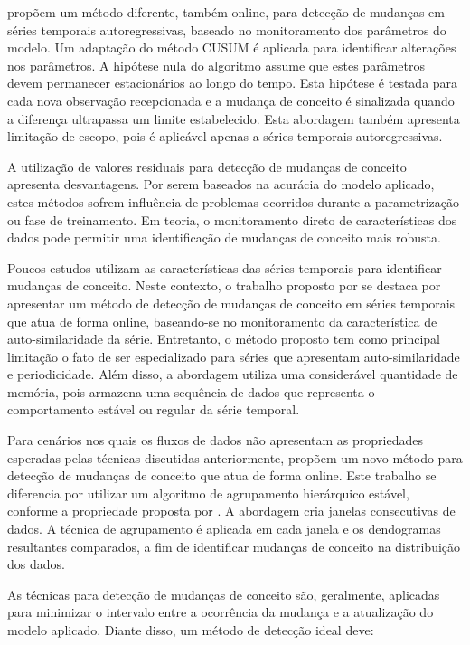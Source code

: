 \documentclass[msc, classic, a4paper]{ufbathesis}
\begin{document}
 propõem um método diferente, também online, para detecção de mudanças em séries temporais autoregressivas, baseado no monitoramento dos parâmetros do modelo. Um adaptação do método CUSUM \cite{Page:CUSUM:PageHinkley:1954} é aplicada para identificar alterações nos parâmetros. A hipótese nula do algoritmo assume que estes parâmetros devem permanecer estacionários ao longo do tempo. Esta hipótese é testada para cada nova observação recepcionada e a mudança de conceito é sinalizada quando a diferença ultrapassa um limite estabelecido. Esta abordagem também apresenta limitação de escopo, pois é aplicável apenas a séries temporais autoregressivas.

A utilização de valores residuais para detecção de mudanças de conceito  apresenta desvantagens. Por serem baseados na acurácia do modelo aplicado, estes métodos sofrem influência de problemas ocorridos durante a parametrização ou fase de treinamento. Em teoria, o monitoramento direto de características dos dados pode permitir uma identificação de mudanças de conceito mais robusta.

Poucos estudos utilizam as características das séries temporais para identificar mudanças de conceito. Neste contexto, o trabalho proposto por   se destaca por apresentar um método de detecção de mudanças de conceito em séries temporais que atua de forma online, baseando-se no monitoramento da característica de auto-similaridade da série.
Entretanto, o método proposto tem como principal limitação o fato de ser especializado para séries que apresentam auto-similaridade e periodicidade. Além disso, a abordagem utiliza uma considerável quantidade de memória, pois armazena uma sequência de dados que representa o comportamento estável ou regular da série temporal.

Para cenários nos quais os fluxos de dados não apresentam as propriedades esperadas pelas técnicas discutidas anteriormente,  propõem um novo método para detecção de mudanças de conceito que atua de forma online.
Este trabalho se diferencia por utilizar um algoritmo de agrupamento hierárquico estável, conforme a propriedade proposta por .
A abordagem cria janelas consecutivas de dados. A técnica de agrupamento é aplicada em cada janela e os dendogramas resultantes comparados, a fim de identificar mudanças de conceito na distribuição dos dados.

As técnicas para detecção de mudanças de conceito são, geralmente, aplicadas para minimizar o intervalo entre a ocorrência da mudança e a atualização do modelo aplicado. Diante disso, um método de detecção ideal deve:
\end{document}
